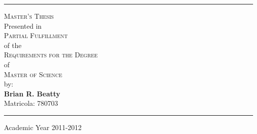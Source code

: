 \begin{titlepage}
\begin{flushleft}
\end{flushleft}
\rule{\linewidth}{0.5mm}
\begin{centering}

  {\small{\Large\scshape Master's Thesis}\\Presented in\\{\Large\scshape Partial Fulfillment}\\of the\\{\Large\scshape Requirements for the Degree}\\of\\{\Large\scshape Master of Science}\\by:\\}
  \vspace*{0.5em}\textbf{\LARGE Brian R. Beatty}\\ \vspace*{0.5em}\small Matricola: 780703 \\ 
\vspace*{1em}
\rule{\linewidth}{0.5mm}

\end{centering}
\vspace*{0.5cm}
\begin{center}



  Academic Year 2011-2012
\end{center} \clearpage

\end{titlepage}
